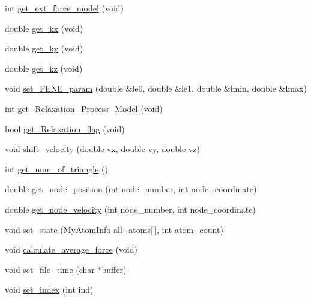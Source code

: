 \begin{DoxyCompactItemize}
\item 
int \mbox{\hyperlink{classMembrane_a21c7c4cff243f25e66ff246ca9d3f7c1}{get\+\_\+ext\+\_\+force\+\_\+model}} (void)
\item 
double \mbox{\hyperlink{classMembrane_a1cb01f73e31eb372e4c4c1fa0c5c08f6}{get\+\_\+kx}} (void)
\item 
double \mbox{\hyperlink{classMembrane_add4864554e6fc640a179acd78db4e80f}{get\+\_\+ky}} (void)
\item 
double \mbox{\hyperlink{classMembrane_a7b75c615b3307a35e8e0a183e67f970a}{get\+\_\+kz}} (void)
\item 
void \mbox{\hyperlink{classMembrane_ae240d9a481d914b7e5092bb9183aa0fa}{set\+\_\+\+F\+E\+N\+E\+\_\+param}} (double \&le0, double \&le1, double \&lmin, double \&lmax)
\item 
int \mbox{\hyperlink{classMembrane_adb66c58c9e5a24936c5ac2ec9bd42290}{get\+\_\+\+Relaxation\+\_\+\+Process\+\_\+\+Model}} (void)
\item 
bool \mbox{\hyperlink{classMembrane_a992f7a356099ef58417254d8218fe357}{get\+\_\+\+Relaxation\+\_\+flag}} (void)
\item 
void \mbox{\hyperlink{classMembrane_a2fb1efa5e780590d62530cc31c8e6b07}{shift\+\_\+velocity}} (double vx, double vy, double vz)
\item 
int \mbox{\hyperlink{classMembrane_a2ab5e9ec0ae823cfa224be4db90e11c5}{get\+\_\+num\+\_\+of\+\_\+triangle}} ()
\item 
double \mbox{\hyperlink{classMembrane_a72b951cd255e853e51db5dcaa0bfc9d5}{get\+\_\+node\+\_\+position}} (int node\+\_\+number, int node\+\_\+coordinate)
\item 
double \mbox{\hyperlink{classMembrane_aa98408c0a273e6e2219618d98f7cb800}{get\+\_\+node\+\_\+velocity}} (int node\+\_\+number, int node\+\_\+coordinate)
\item 
void \mbox{\hyperlink{classMembrane_abdf30f7d1997c4e01eebf03ab646172a}{set\+\_\+state}} (\mbox{\hyperlink{structMyAtomInfo}{My\+Atom\+Info}} all\+\_\+atoms\mbox{[}$\,$\mbox{]}, int atom\+\_\+count)
\item 
void \mbox{\hyperlink{classMembrane_a696ec76d17d33335f2c41aa498485e56}{calculate\+\_\+average\+\_\+force}} (void)
\item 
void \mbox{\hyperlink{classMembrane_a6b74827fd9dc653001b7cd6315b065a2}{set\+\_\+file\+\_\+time}} (char $\ast$buffer)
\item 
void \mbox{\hyperlink{classMembrane_aaf51e7b1813da0f499d36664d7486db7}{set\+\_\+index}} (int ind)
\item 

\end{DoxyCompactItemize}
